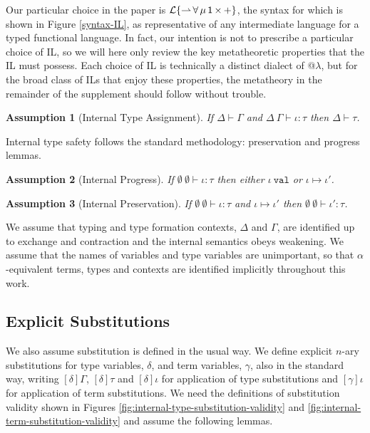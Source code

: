 \documentclass[12pt]{article}
\newtheorem{assumption}{Assumption}
\begin{document}
Our particular choice in the paper is {$\mathcal{L}\{{\rightharpoonup}\,{\forall}\,{\mu}\,{{\sf 1}}\,{\times}\,{+}\}$}, the syntax for which is shown in Figure \ref{syntax-IL}, as representative of any intermediate language for a typed functional language. In fact, our intention is not to prescribe a particular choice of IL, so we will here only review the key metatheoretic properties that the IL must possess. Each choice of IL is technically a distinct dialect of @$\lambda$, but for the broad class of ILs that enjoy these properties, the metatheory in the remainder of the supplement should follow without trouble.

\begin{assumption}[Internal Type Assignment]
If $\Delta \vdash \Gamma$ and $\Delta~\Gamma \vdash \iota : \tau$ then $\Delta \vdash \tau$.
\end{assumption}

Internal type safety follows the standard methodology: preservation and progress lemmas.

\begin{assumption}[Internal Progress]
If $\emptyset~\emptyset \vdash \iota : \tau$ then either $\iota~\texttt{val}$ or $\iota \mapsto \iota'$.
\end{assumption}
\begin{assumption}[Internal Preservation]
If $\emptyset~\emptyset \vdash \iota : \tau$ and $\iota \mapsto \iota'$ then $\emptyset~\emptyset \vdash \iota' : \tau$. 
\end{assumption}

We assume that typing and type formation contexts, $\Delta$ and $\Gamma$, are identified up to exchange and contraction and the internal semantics obeys weakening. We assume that the names of variables and type variables are unimportant, so that $\alpha$-equivalent terms, types and contexts are identified implicitly throughout this work. 

\subsection{Explicit Substitutions}
We also assume substitution is defined in the usual way. We define explicit $n$-ary substitutions for type variables, $\delta$, and term variables, $\gamma$, also in the standard way, writing $[\delta]\Gamma$, $[\delta]\tau$ and $[\delta]\iota$ for application of type substitutions and $[\gamma]\iota$ for application of term substitutions. We need the definitions of substitution validity shown in Figures \ref{fig:internal-type-substitution-validity} and \ref{fig:internal-term-substitution-validity} and assume the following lemmas.
\end{document}
